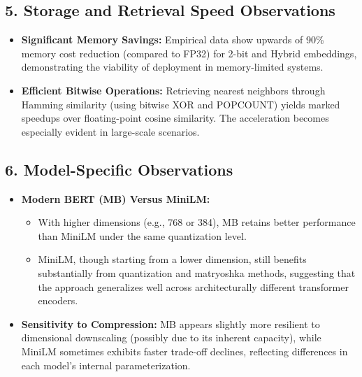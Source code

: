 \documentclass{article}
\begin{document}
\subsection*{5. Storage and Retrieval Speed Observations}
\begin{itemize}
    \item \textbf{Significant Memory Savings:} Empirical data show upwards of 90\% memory cost reduction (compared to FP32) for 2-bit and Hybrid embeddings, demonstrating the viability of deployment in memory-limited systems.
    \item \textbf{Efficient Bitwise Operations:} Retrieving nearest neighbors through Hamming similarity (using bitwise XOR and POPCOUNT) yields marked speedups over floating-point cosine similarity. The acceleration becomes especially evident in large-scale scenarios.
\end{itemize}

\subsection*{6. Model-Specific Observations}
\begin{itemize}
    \item \textbf{Modern BERT (MB) Versus MiniLM:} 
    \begin{itemize}
        \item With higher dimensions (e.g., 768 or 384), MB retains better performance than MiniLM under the same quantization level. 
        \item MiniLM, though starting from a lower dimension, still benefits substantially from quantization and matryoshka methods, suggesting that the approach generalizes well across architecturally different transformer encoders.
    \end{itemize}
    \item \textbf{Sensitivity to Compression:} MB appears slightly more resilient to dimensional downscaling (possibly due to its inherent capacity), while MiniLM sometimes exhibits faster trade-off declines, reflecting differences in each model’s internal parameterization.
\end{itemize}
\end{document}
